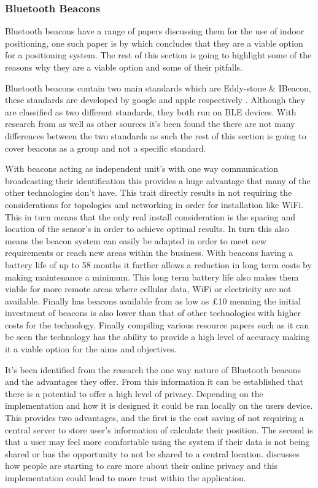 \subsubsection{Bluetooth Beacons}
Bluetooth beacons have a range of papers discussing them for the use of indoor positioning, one such paper is by \citetemp which concludes that they are a viable option for a positioning system. The rest of this section is going to highlight some of the reasons why they are a viable option and some of their pitfalls. 

Bluetooth beacons contain two main standards which are Eddy-stone \& IBeacon, these standards are developed by google and apple respectively \citetemp. Although they are classified as two different standards, they both run on BLE devices. With research from \citetemp as well as other sources it's been found the there are not many differences between the two standards as such the rest of this section is going to cover beacons as a group and not a specific standard.

With beacons acting as independent unit's with one way communication broadcasting their identification \citetemp this provides a huge advantage that many of the other technologies don't have. This trait directly results in not requiring the considerations for topologies and networking in order for installation like WiFi. This in turn means that the only real install consideration is the spacing and location of the sensor's in order to achieve optimal results. In turn this also means the beacon system can easily be adapted in order to meet new requirements or reach new areas within the business. With beacons having a battery life of up to 58 months \citetemp it further allows a reduction in long term costs by making maintenance a minimum. This long term battery life also makes them viable for more remote areas where cellular data, WiFi or electricity are not available. Finally \citetemp has beacons available from as low as £10 meaning the initial investment of beacons is also lower than that of other technologies with higher costs for the technology. Finally compiling various resource papers such as \citetemp it can be seen the technology has the ability to provide a high level of accuracy making it a viable option for the aims and objectives.

It's been identified from the research the one way nature of Bluetooth beacons and the advantages they offer. From this information it can be established that there is a potential to offer a high level of privacy. Depending on the implementation and how it is designed it could be ran locally on the users device. This provides two advantages, and the first is the cost saving of not requiring a central server to store user's information of calculate their position. The second is that a user may feel more comfortable using the system if their data is not being shared or has the opportunity to not be shared to a central location. \citetemp discusses how people are starting to care more about their online privacy and this implementation could lead to more trust within the application.

